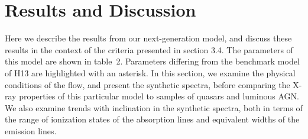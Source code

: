 \documentclass[useAMS,usenatbib]{mn2e_x}
\begin{document}




\section{Results and Discussion}

Here we describe the results from our next-generation model,
and discuss these results in the context of the criteria 
presented in section 3.4. The parameters of this model are shown in table~2.
Parameters differing from the benchmark model of H13 are 
highlighted with an asterisk. In this section, we examine the physical 
conditions of the flow, and present the synthetic spectra, before comparing
the X-ray properties of this particular model to samples of
quasars and luminous AGN. We also examine trends with inclination in the synthetic spectra, 
both in terms of the range of ionization states of the absorption lines and equivalent widths 
of the emission lines.
\end{document}
